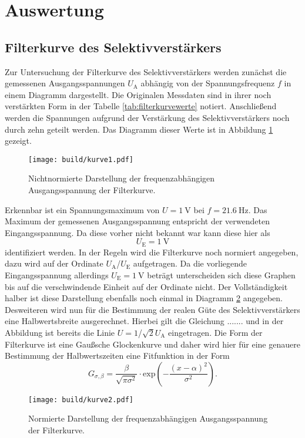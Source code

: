 \section{Auswertung}

\subsection{Filterkurve des Selektivverstärkers}

Zur Untersuchung der Filterkurve des Selektivverstärkers werden zunächst die gemessenen Ausgangsspannungen $U_{\text{A}}$ abhängig von der Spannungsfrequenz $f$ in einem Diagramm dargestellt.  Die Originalen Messdaten sind in ihrer noch verstärkten Form in der Tabelle \ref{tab:filterkurvewerte} notiert.
Anschließend werden die Spannungen aufgrund der Verstärkung des Selektivverstärkers noch durch zehn geteilt werden.
Das Diagramm dieser Werte ist in Abbildung \ref{fig:kurve1} gezeigt.

\begin{figure}
    \centering
    \texttt{[image: build/kurve1.pdf]}
    \caption{Nichtnormierte Darstellung der frequenzabhängigen Ausgangsspannung der Filterkurve.} 
    \label{fig:kurve1}
\end{figure}

Erkennbar ist ein Spannungsmaximum von $U = \SI{1}{\volt}$ bei $f = \SI{21.6}{\hertz}$. Das Maximum der gemessenen Ausgangsspannung entspricht der verwendeten Eingangsspannung. Da diese vorher nicht bekannt war kann diese hier als 
\begin{equation*}
U_{\text{E}} = \SI{1}{\volt}
\end{equation*}
identifiziert werden. In der Regeln wird die Filterkurve noch normiert angegeben, dazu wird auf der Ordinate $U_{\text{A}}$/$U_{\text{E}}$ aufgetragen. Da die vorliegende Eingangsspannung allerdings $U_{\text{E}} = \SI{1}{\volt}$ beträgt 
unterscheiden sich diese Graphen bis auf die verschwindende Einheit auf der Ordinate nicht. 
Der Vollständigkeit halber ist diese Darstellung ebenfalls noch einmal in Diagramm \ref{fig:kurve2} angegeben.
Desweiteren wird nun für die Bestimmung der realen Güte des Selektivverstärkers eine Halbwertsbreite ausgerechnet. Hierbei gilt die Gleichung .......
und in der Abbildung ist bereits die Linie $U = 1$/$\sqrt{2} U_{\text{A}}$ eingetragen. Die Form der Filterkurve ist eine Gaußsche Glockenkurve und daher wird hier für eine
genauere Bestimmung der Halbwertszeiten eine Fitfunktion in der Form \cite{gauss}
\begin{equation}
G_{\sigma, \beta} =  \frac{\beta}{\sqrt{\pi \sigma^2}} \cdot \text{exp}\left( -\frac{(x- \alpha)^2}{\sigma^2}\right).
\end{equation}

\begin{figure}
    \centering
    \texttt{[image: build/kurve2.pdf]}
    \caption{Normierte Darstellung der frequenzabhängigen Ausgangsspannung der Filterkurve.} 
    \label{fig:kurve2}
\end{figure}



